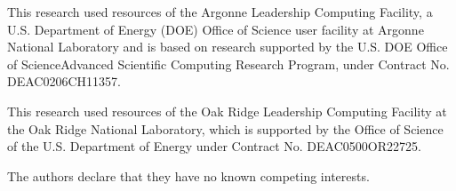 \documentclass[letterpaper,10pt,english]{jupyterBook}
\begin{document}
\sphinxAtStartPar
This research used resources of the Argonne Leadership Computing Facility, a U.S. Department of Energy (DOE) Office of Science user facility at Argonne National Laboratory and is based on research supported by the U.S. DOE Office of Science\sphinxhyphen{}Advanced Scientific Computing Research Program, under Contract No. DE\sphinxhyphen{}AC02\sphinxhyphen{}06CH11357.

\sphinxAtStartPar
This research used resources of the Oak Ridge Leadership Computing Facility at the Oak Ridge National Laboratory, which is supported by the Office of Science of the U.S. Department of Energy under Contract No. DE\sphinxhyphen{}AC05\sphinxhyphen{}00OR22725.

\begin{DUlineblock}{0em}
\item[] 
\end{DUlineblock}

\sphinxAtStartPar
The authors declare that they have no known competing interests.

\sphinxstepscope
\end{document}
